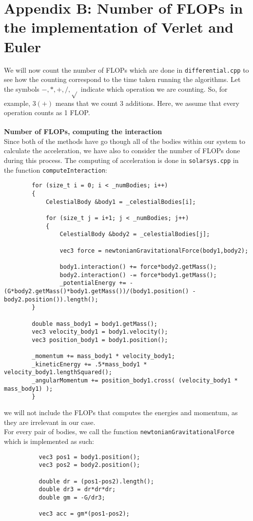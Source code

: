 \documentclass[12pt]{article}
\begin{document}
	\section*{Appendix B: Number of FLOPs in the implementation of Verlet and Euler}
	 We will now count the number of FLOPs which are done in \texttt{differential.cpp} to see how the counting correspond to the time taken running the algorithms. Let the symbols $-,*,+,/,\sqrt{}$ indicate which operation we are counting. So, for example, $3(+)$ means that we count 3 additions. Here, we assume that every operation counts as 1 FLOP. \\ \hfill \\
	 \textbf{Number of FLOPs, computing the interaction} \\Since both of the methods have go though all of the bodies within our system to calculate the acceleration, we have also to consider the number of FLOPs done during this process. The computing of acceleration is done in \texttt{solarsys.cpp} in the function \texttt{computeInteraction}:
	 \begin{lstlisting}
	 	for (size_t i = 0; i < _numBodies; i++)
	 	{
		 	CelestialBody &body1 = _celestialBodies[i];
	 	
		 	for (size_t j = i+1; j < _numBodies; j++)
		 	{
			 	CelestialBody &body2 = _celestialBodies[j];
	 	
			 	vec3 force = newtonianGravitationalForce(body1,body2);
	 	
			 	body1.interaction() += force*body2.getMass();
			 	body2.interaction() -= force*body1.getMass();
			 	_potentialEnergy += -(G*body2.getMass()*body1.getMass())/(body1.position() - body2.position()).length();
	 	}
	 	
	 	double mass_body1 = body1.getMass();
	 	vec3 velocity_body1 = body1.velocity();
	 	vec3 position_body1 = body1.position();
	 	
	 	_momentum += mass_body1 * velocity_body1;
	 	_kineticEnergy += .5*mass_body1 * velocity_body1.lengthSquared();
	 	_angularMomentum += position_body1.cross( (velocity_body1 * mass_body1) );
	 	}
	 \end{lstlisting}
	 we will not include the FLOPs that computes the energies and momentum, as they are irrelevant in our case.\\ \newpage For every pair of bodies, we call the function \texttt{newtonianGravitationalForce} which is implemented as such:
	 \begin{lstlisting}
	 	  vec3 pos1 = body1.position();
	 	  vec3 pos2 = body2.position();
	 	  
	 	  double dr = (pos1-pos2).length();
	 	  double dr3 = dr*dr*dr;
	 	  double gm = -G/dr3;
	 	  
	 	  vec3 acc = gm*(pos1-pos2);
	 \end{lstlisting}
\end{document}
